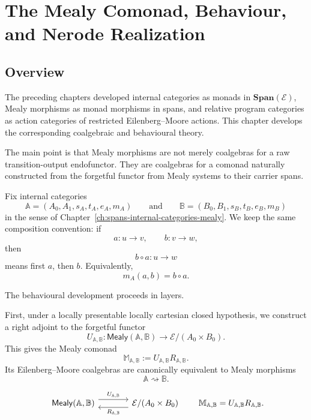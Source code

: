 \chapter{The Mealy Comonad, Behaviour, and Nerode Realization}
\label{ch:mealy-comonad-behaviour-nerode}

\section{Overview}
\label{sec:mealy-comonad-overview}

The preceding chapters developed internal categories as monads in
\(\mathbf{Span}(\mathcal E)\), Mealy morphisms as monad morphisms in spans,
and relative program categories as action categories of restricted
Eilenberg--Moore actions. This chapter develops the corresponding
coalgebraic and behavioural theory.

The main point is that Mealy morphisms are not merely coalgebras for a raw
transition-output endofunctor. They are coalgebras for a comonad naturally
constructed from the forgetful functor from Mealy systems to their carrier
spans.

Fix internal categories
\[
\mathbb A
=
(A_0,A_1,s_A,t_A,e_A,m_A)
\qquad\text{and}\qquad
\mathbb B
=
(B_0,B_1,s_B,t_B,e_B,m_B)
\]
in the sense of Chapter~\ref{ch:spans-internal-categories-mealy}. We keep the
same composition convention: if
\[
a:u\to v,
\qquad
b:v\to w,
\]
then
\[
b\circ a:u\to w
\]
means first \(a\), then \(b\). Equivalently,
\[
m_A(a,b)=b\circ a.
\]

The behavioural development proceeds in layers.

First, under a locally presentable locally cartesian closed hypothesis, we
construct a right adjoint to the forgetful functor
\[
U_{\mathbb A,\mathbb B}:
\mathsf{Mealy}(\mathbb A,\mathbb B)
\longrightarrow
\mathcal E/(A_0\times B_0).
\]
This gives the Mealy comonad
\[
\mathbb M_{\mathbb A,\mathbb B}
:=
U_{\mathbb A,\mathbb B}R_{\mathbb A,\mathbb B}.
\]
Its Eilenberg--Moore coalgebras are canonically equivalent to Mealy morphisms
\[
\mathbb A\rightsquigarrow\mathbb B.
\]

\[
\begin{tikzcd}[column sep=large]
\mathsf{Mealy}(\mathbb A,\mathbb B)
\arrow[r, shift left=1.1ex, "U_{\mathbb A,\mathbb B}"]
&
\mathcal E/(A_0\times B_0)
\arrow[l, shift left=1.1ex, "R_{\mathbb A,\mathbb B}"]
\end{tikzcd}
\qquad
\mathbb M_{\mathbb A,\mathbb B}=U_{\mathbb A,\mathbb B}R_{\mathbb A,\mathbb B}.
\]

